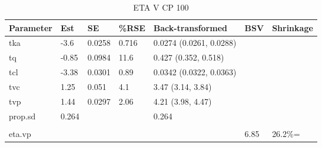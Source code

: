 \begin{table}
\centering\centering
\caption{ETA V CP 100}
\centering
\fontsize{8}{10}\selectfont
\begin{tabular}[t]{lllllll}
\toprule
\textbf{Parameter} & \textbf{Est} & \textbf{SE} & \textbf{\%RSE} & \textbf{Back-transformed} & \textbf{BSV} & \textbf{Shrinkage}\\
\midrule
tka & -3.6 & 0.0258 & 0.716 & 0.0274 (0.0261, 0.0288) &  & \\
\midrule
tq & -0.85 & 0.0984 & 11.6 & 0.427 (0.352, 0.518) &  & \\
\midrule
tcl & -3.38 & 0.0301 & 0.89 & 0.0342 (0.0322, 0.0363) &  & \\
\midrule
tvc & 1.25 & 0.051 & 4.1 & 3.47 (3.14, 3.84) &  & \\
\midrule
tvp & 1.44 & 0.0297 & 2.06 & 4.21 (3.98, 4.47) &  & \\
\midrule
prop.sd & 0.264 &  &  & 0.264 &  & \\
\midrule\\
eta.vp &  &  &  &  & 6.85 & 26.2\%=\\
\bottomrule
\end{tabular}
\end{table}